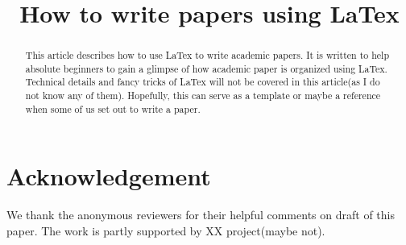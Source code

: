 \documentclass[conference]{IEEEtran}
\begin{document}
\newtheorem{definition}{\textbf{Definition}}
\newtheorem{lemma}{\textbf{Lemma}}
\newtheorem{theorem}{\textbf{Theorem}}
\newtheorem{claim}{\textbf{Claim}}
\newtheorem{corollary}{\textbf{Corollary}}
\newtheorem{observation}{\textbf{Observation}}
\newtheorem{property}{\textbf{Property}}



\title{How to write papers using LaTex}

\author{
}

\maketitle

\begin{abstract}
This article describes how to use LaTex to write academic papers. It is written to help absolute beginners to gain a glimpse of how academic paper is organized using LaTex. Technical details and fancy tricks of LaTex will not be covered in this article(as I do not know any of them). Hopefully, this can serve as a template or maybe a reference when some of us set out to write a paper. 
\end{abstract}
















\section{Acknowledgement}
We thank the anonymous reviewers for their helpful comments on draft of this paper.
The work is partly supported by XX project(maybe not).





\end{document}
